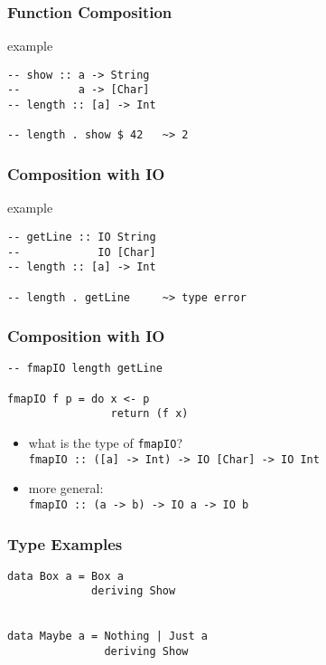 \documentclass[dvipsnames]{beamer}
\theoremstyle{plain}
\begin{document}
\begin{frame}[fragile]
  \frametitle{Function Composition}

  \begin{exampleblock}{example}
    \begin{lstlisting}
-- show :: a -> String
--         a -> [Char]
-- length :: [a] -> Int

-- length . show $ 42   ~> 2
    \end{lstlisting}
  \end{exampleblock}
\end{frame}

\begin{frame}[fragile]
  \frametitle{Composition with IO}

  \begin{exampleblock}{example}
    \begin{lstlisting}
-- getLine :: IO String
--            IO [Char]
-- length :: [a] -> Int

-- length . getLine     ~> type error
    \end{lstlisting}
  \end{exampleblock}
\end{frame}

\begin{frame}[fragile]
  \frametitle{Composition with IO}

  \begin{exampleblock}{}
    \begin{lstlisting}
-- fmapIO length getLine

fmapIO f p = do x <- p
                return (f x)
    \end{lstlisting}

    \pause
    \medskip
    \begin{itemize}
      \item what is the type of \lstinline|fmapIO|?\\
        \lstinline|fmapIO :: ([a] -> Int) -> IO [Char] -> IO Int|
      \pause
      \smallskip
      \item more general:\\
        \lstinline|fmapIO :: (a -> b) -> IO a -> IO b|
    \end{itemize}
  \end{exampleblock}
\end{frame}

\begin{frame}[fragile]
  \frametitle{Type Examples}

  \begin{lstlisting}
data Box a = Box a
             deriving Show


data Maybe a = Nothing | Just a
               deriving Show
  \end{lstlisting}
\end{frame}
\end{document}
